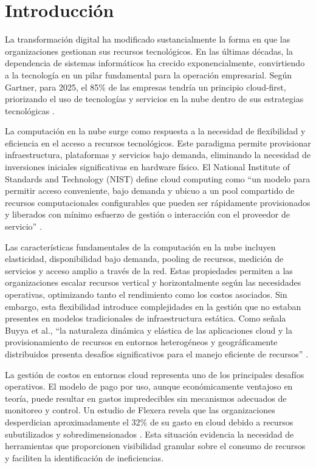 \chapter{Introducción}

La transformación digital ha modificado sustancialmente la forma en que las organizaciones gestionan sus recursos tecnológicos. En las últimas décadas, la dependencia de sistemas informáticos ha crecido exponencialmente, convirtiendo a la tecnología en un pilar fundamental para la operación empresarial. Según Gartner, para 2025, el 85\% de las empresas tendría un principio cloud-first, priorizando el uso de tecnologías y servicios en la nube dentro de sus estrategias tecnológicas \parencite{Gartner2021}.

La computación en la nube surge como respuesta a la necesidad de flexibilidad y eficiencia en el acceso a recursos tecnológicos. Este paradigma permite provisionar infraestructura, plataformas y servicios bajo demanda, eliminando la necesidad de inversiones iniciales significativas en hardware físico. El National Institute of Standards and Technology (NIST) define cloud computing como ``un modelo para permitir acceso conveniente, bajo demanda y ubicuo a un pool compartido de recursos computacionales configurables que pueden ser rápidamente provisionados y liberados con mínimo esfuerzo de gestión o interacción con el proveedor de servicio'' \parencite{Mell2011}.

Las características fundamentales de la computación en la nube incluyen elasticidad, disponibilidad bajo demanda, pooling de recursos, medición de servicios y acceso amplio a través de la red. Estas propiedades permiten a las organizaciones escalar recursos vertical y horizontalmente según las necesidades operativas, optimizando tanto el rendimiento como los costos asociados. Sin embargo, esta flexibilidad introduce complejidades en la gestión que no estaban presentes en modelos tradicionales de infraestructura estática. Como señala Buyya et al., ``la naturaleza dinámica y elástica de las aplicaciones cloud y la provisionamiento de recursos en entornos heterogéneos y geográficamente distribuidos presenta desafíos significativos para el manejo eficiente de recursos'' \parencite{Buyya2013}.

La gestión de costos en entornos cloud representa uno de los principales desafíos operativos. El modelo de pago por uso, aunque económicamente ventajoso en teoría, puede resultar en gastos impredecibles sin mecanismos adecuados de monitoreo y control. Un estudio de Flexera revela que las organizaciones desperdician aproximadamente el 32\% de su gasto en cloud debido a recursos subutilizados y sobredimensionados \parencite{Flexera2023}. Esta situación evidencia la necesidad de herramientas que proporcionen visibilidad granular sobre el consumo de recursos y faciliten la identificación de ineficiencias.

